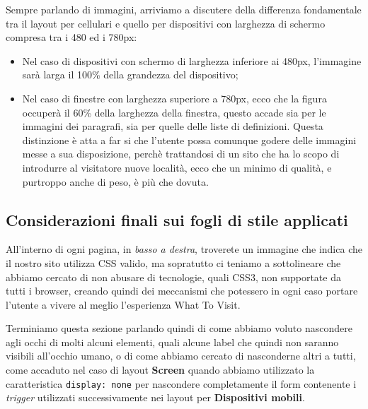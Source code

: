 Sempre parlando di immagini, arriviamo a discutere della differenza
fondamentale tra il layout per cellulari e quello per dispositivi con
larghezza di schermo compresa tra i 480 ed i 780px:
\begin{itemize}
\item Nel caso di dispositivi con schermo di larghezza inferiore ai 480px,
l'immagine sarà larga il 100\% della grandezza del dispositivo;
\item Nel caso di finestre con larghezza superiore a 780px, ecco che la figura
occuperà il 60\% della larghezza della finestra, questo accade sia per le
immagini dei paragrafi, sia per quelle delle liste di definizioni. Questa
distinzione è atta a far si che l'utente possa comunque godere delle immagini
messe a sua disposizione, perchè trattandosi di un sito che ha lo scopo di
introdurre al visitatore nuove località, ecco che un minimo di qualità, e
purtroppo anche di peso, è più che dovuta.
\end{itemize}

\subsection{Considerazioni finali sui fogli di stile applicati}\label{sec:Pres-CSSValid}
All'interno di ogni pagina, in \textit{basso a destra}, troverete un immagine
che indica che il nostro sito utilizza CSS valido, ma sopratutto ci teniamo a
sottolineare che abbiamo cercato di non abusare di tecnologie, quali CSS3, non
supportate da tutti i browser, creando quindi dei meccanismi che potessero in
ogni caso portare l'utente a vivere al meglio l'esperienza What To Visit.

Terminiamo questa sezione parlando quindi di come abbiamo voluto nascondere
agli occhi di molti alcuni elementi, quali alcune label che quindi non saranno
visibili all'occhio umano, o di come abbiamo cercato di nasconderne altri a
tutti, come accaduto nel caso di layout \textbf{Screen} quando abbiamo
utilizzato la caratteristica \texttt{display: none} per nascondere
completamente il form contenente i \textit{trigger} utilizzati successivamente
nei layout per \textbf{Dispositivi mobili}.
